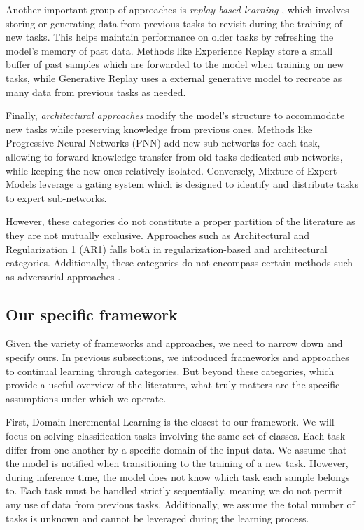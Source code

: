 \documentclass[11pt]{article}
\begin{document}
\vspace{2mm}
\noindent
Another important group of approaches is \textit{replay-based learning} \cite{replay_1}\cite{replay_2}\cite{replay_3}\cite{replay_4}\cite{replay_5_RtF}\cite{replay_6_GEM}\cite{replay_7_DGR}, which involves storing or generating data from previous tasks to revisit during the training of new tasks. This helps maintain performance on older tasks by refreshing the model's memory of past data. Methods like Experience Replay \cite{replay_3} store a small buffer of past samples which are forwarded to the model when training on new tasks, while Generative Replay \cite{replay_2}\cite{replay_4}\cite{replay_5_RtF}\cite{replay_7_DGR}uses a external generative model to recreate as many data from previous tasks as needed. 

\vspace{2mm}
\noindent
Finally, \textit{architectural approaches} modify the model's structure to accommodate new tasks while preserving knowledge from previous ones. Methods like Progressive Neural Networks (PNN) \cite{PNN} add new sub-networks for each task, allowing to forward knowledge transfer from old tasks dedicated sub-networks, while keeping the new ones relatively isolated. Conversely, Mixture of Expert Models \cite{moe_1}\cite{moe_2} leverage a gating system which is designed to identify and distribute tasks to expert sub-networks.

\vspace{2mm}
\noindent
However, these categories do not constitute a proper partition of the literature as they are not mutually exclusive. Approaches such as Architectural and Regularization 1 (AR1) \cite{AR1} falls both in regularization-based and architectural categories. Additionally, these categories do not encompass certain methods such as adversarial approaches \cite{EWC_6_Adversarial_CL}.


\subsection{Our specific framework}


Given the variety of frameworks and approaches, we need to narrow down and specify ours. In previous subsections, we introduced frameworks and approaches to continual learning through categories. But beyond these categories, which provide a useful overview of the literature, what truly matters are the specific assumptions under which we operate.

\vspace{2mm}
\noindent
First, Domain Incremental Learning is the closest to our framework. We will focus on solving classification tasks involving the same set of classes. Each task differ from one another by a specific domain of the input data. We assume that the model is notified when transitioning to the training of a new task. However, during inference time, the model does not know which task each sample belongs to. Each task must be handled strictly sequentially, meaning we do not permit any use of data from previous tasks. Additionally, we assume the total number of tasks is unknown and cannot be leveraged during the learning process.
\end{document}
